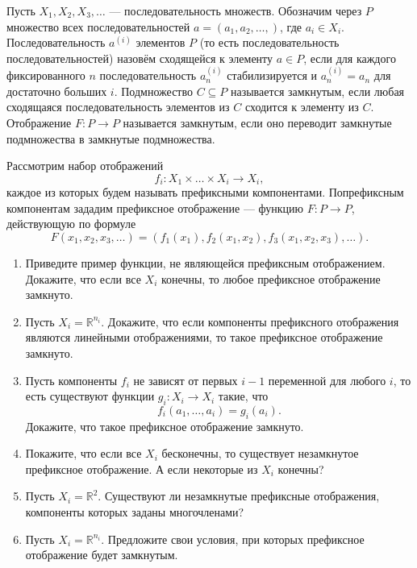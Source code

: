 
Пусть $X_1, X_2, X_3, \ldots$ --- последовательность множеств. Обозначим через $P$ множество всех последовательностей $a=(a_1, a_2, \ldots, )$, где $a_i \in X_i$. Последовательность $a^{(i)}$ элементов $P$ (то есть последовательность последовательностей) назовём сходящейся к элементу $a \in P$, если для каждого фиксированного $n$ последовательность $a_n^{(i)}$ стабилизируется и $a_n^{(i)} = a_n$ для достаточно больших $i$. Подмножество $C \subseteq P$ называется замкнутым, если любая сходящаяся последовательность элементов из $C$ сходится к элементу из $C$. Отображение $F: P \to P$ называется замкнутым, если оно переводит замкнутые подмножества в замкнутые подмножества. 

Рассмотрим набор отображений
$$f_i: X_1 \times \ldots \times X_i \longrightarrow X_i, $$ 
каждое из которых будем называть префиксными компонентами. По\linebreak префиксным компонентам зададим префиксное отображение --- функцию $F: P \to P$, действующую по формуле
$$F(x_1, x_2, x_3, \ldots) = (f_1(x_1), f_2(x_1,x_2), f_3(x_1, x_2, x_3), \ldots).$$ 

\begin{enumerate}
\item Приведите пример функции, не являющейся префиксным отображением. Докажите, что если все $X_i$ конечны, то любое префиксное отображение замкнуто. 
\item Пусть $X_i = \mathbb{R}^{n_i}$. Докажите, что если компоненты префиксного отображения являются линейными отображениями, то такое префиксное отображение замкнуто.
\item Пусть компоненты $f_i$ не зависят от первых $i-1$ переменной для любого $i$, то есть существуют функции $g_i:X_i \to X_i$ такие, что
	$$f_i(a_1, \ldots, a_i) = g_i(a_i).$$
Докажите, что такое префиксное отображение замкнуто.
\item Покажите, что если все $X_i$ бесконечны, то существует незамкнутое префиксное отображение. А если некоторые из $X_i$ конечны?
\item Пусть $X_i = \mathbb{R}^2$. Существуют ли незамкнутые префиксные отображения, компоненты которых заданы многочленами?
\item Пусть $X_i = \mathbb{R}^{n_i}$. Предложите свои условия, при которых префиксное отображение будет замкнутым. 
\end{enumerate}